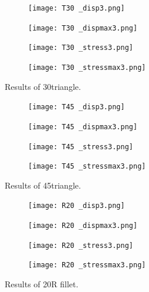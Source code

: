 \documentclass[../main.tex]{subfiles}
\begin{document}
\begin{figure}
  \centering 
  \begin{subfigure}[b]{0.45\textwidth}
    \centering 
    \texttt{[image: T30 \_disp3.png]}
    \label{}
  \end{subfigure}
  \begin{subfigure}[b]{0.45\textwidth}
    \centering 
    \texttt{[image: T30 \_dispmax3.png]}
    \label{}
  \end{subfigure}
  \begin{subfigure}[b]{0.45\textwidth}
    \centering 
    \texttt{[image: T30 \_stress3.png]}
    \label{}
  \end{subfigure}
  \begin{subfigure}[b]{0.45\textwidth}
    \centering 
    \texttt{[image: T30 \_stressmax3.png]}
    \label{}
  \end{subfigure}
  \caption{Results of 30\degree triangle.}
  \label{fig:tri30_results}
\end{figure}

\begin{figure}
  \centering 
  \begin{subfigure}[b]{0.45\textwidth}
    \centering 
    \texttt{[image: T45 \_disp3.png]}
    \label{}
  \end{subfigure}
  \begin{subfigure}[b]{0.45\textwidth}
    \centering 
    \texttt{[image: T45 \_dispmax3.png]}
    \label{}
  \end{subfigure}
  \begin{subfigure}[b]{0.45\textwidth}
    \centering 
    \texttt{[image: T45 \_stress3.png]}
    \label{}
  \end{subfigure}
  \begin{subfigure}[b]{0.45\textwidth}
    \centering 
    \texttt{[image: T45 \_stressmax3.png]}
    \label{}
  \end{subfigure}
  \caption{Results of 45\degree triangle.}
  \label{fig:tri45_results}
\end{figure}

\begin{figure}[h!]
  \centering 
  \begin{subfigure}[b]{0.45\textwidth}
    \centering 
    \texttt{[image: R20 \_disp3.png]}
    \label{}
  \end{subfigure}
  \begin{subfigure}[b]{0.45\textwidth}
    \centering 
    \texttt{[image: R20 \_dispmax3.png]}
    \label{}
  \end{subfigure}
  \begin{subfigure}[b]{0.45\textwidth}
    \centering 
    \texttt{[image: R20 \_stress3.png]}
    \label{}
  \end{subfigure}
  \begin{subfigure}[b]{0.45\textwidth}
    \centering 
    \texttt{[image: R20 \_stressmax3.png]}
    \label{}
  \end{subfigure}
  \caption{Results of 20R fillet.}
  \label{fig:20r_results}
\end{figure}
\end{document}
